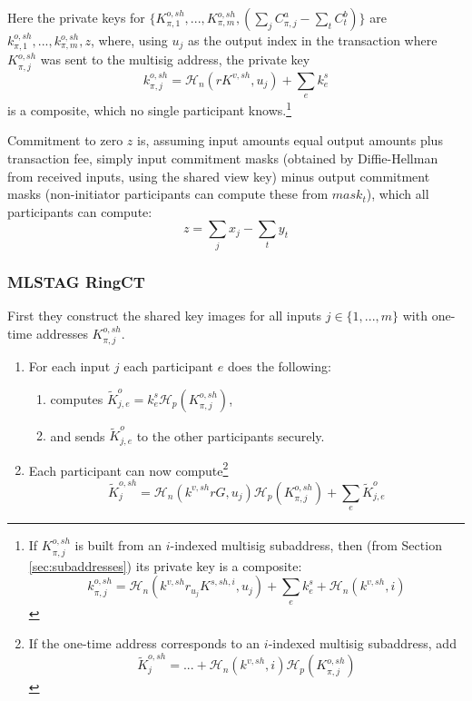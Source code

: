 Here the private keys for 
\(\{K^{o,sh}_{\pi,1},...,K^{o,sh}_{\pi,m}, (\sum\limits_j C_{\pi, j}^a - \sum\limits_t C^b_{t})\}\)
are \(k^{o,sh}_{\pi,1},...,k^{o,sh}_{\pi,m}, z\), where, using $u_j$ as the output index in the transaction where $K^{o,sh}_{\pi,j}$ was sent to the multisig address, the private key
\[k^{o,sh}_{\pi,j} = \mathcal{H}_n(r K^{v,sh}, u_j) + \sum_e k^{s}_e\] 
is a composite, which no single participant knows.\footnote{If $K^{o,sh}_{\pi,j}$ is built from an $i$-indexed multisig subaddress, then (from Section \ref{sec:subaddresses}) its private key is a composite:
\[ k^{o,sh}_{\pi,j} = \mathcal{H}_n(k^{v,sh} r_{u_j} K^{s,sh,i}, u_j) + \sum_e k^{s}_e + \mathcal{H}_n(k^{v,sh},i)\]}

Commitment to zero $z$ is, assuming input amounts equal output amounts plus transaction fee, simply input commitment masks (obtained by Diffie-Hellman from received inputs, using the shared view key) minus output commitment masks (non-initiator participants can compute these from $\mathit{mask}_t$), which all participants can compute:
\[ z = \sum\limits_j x_j - \sum\limits_t y_t \]

\subsubsection*{MLSTAG RingCT}

First they construct the shared key images for all inputs $j \in \{1,...,m\}$ with one-time addresses $K^{o,sh}_{\pi,j}$.

\begin{enumerate}
    \item For each input $j$ each participant $e$ does the following:
    \begin{enumerate}
        \item computes $\tilde{K}^{o}_{j,e} = k^{s}_e \mathcal{H}_p(K^{o,sh}_{\pi,j})$,
        \item and sends $\tilde{K}^{o}_{j,e}$ to the other participants securely.
    \end{enumerate}
    \item Each participant can now compute\footnote{If the one-time address corresponds to an $i$-indexed multisig subaddress, add
    \[ \tilde{K}^{o,sh}_j = ... + \mathcal{H}_n(k^{v,sh},i) \mathcal{H}_p(K^{o,sh}_{\pi,j}) \]}
    \[ \tilde{K}^{o,sh}_j = \mathcal{H}_n(k^{v,sh} r G, u_j) \mathcal{H}_p(K^{o,sh}_{\pi,j}) + \sum_e \tilde{K}^{o}_{j,e} \]
\end{enumerate}

